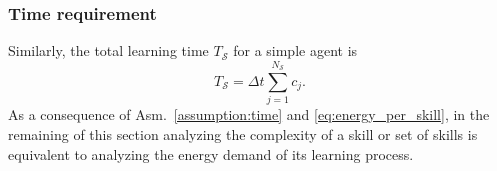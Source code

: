 \subsubsection{\textbf{Time requirement}}
Similarly, the total learning time $T_{\mathcal{S}}$ for a simple agent is
\begin{equation}\label{eq:total_energy}
	T_{\mathcal{S}} = \Delta t \sum_{j=1}^{{N_{\mathcal{S}}}} c_j.
\end{equation}
As a consequence of Asm.~\ref{assumption:time} and \eqref{eq:energy_per_skill}, in the remaining of this section analyzing the complexity of a skill or set of skills is equivalent to analyzing the energy demand of its learning process.

